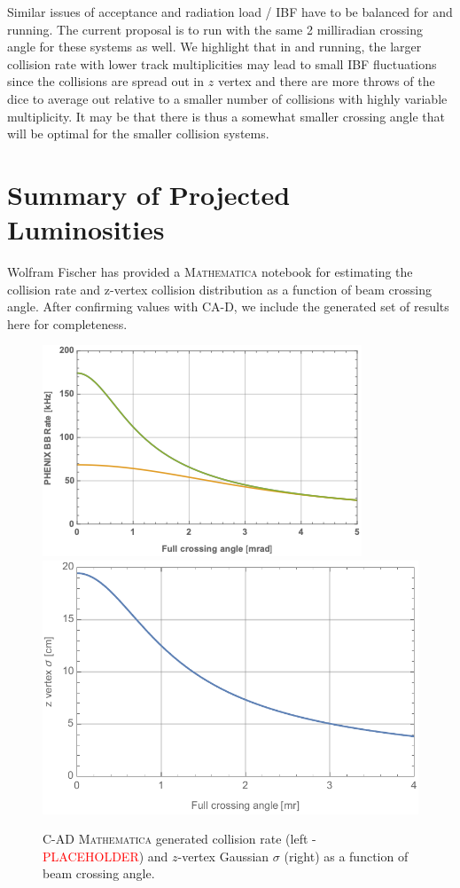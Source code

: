 Similar issues of acceptance and radiation load / IBF have to be balanced for \pp and \pau running.   The current proposal is to run with the same 2 milliradian crossing angle for these systems as well.    We highlight that in \pp and \pau running, the larger collision rate with lower track multiplicities may lead to small IBF fluctuations since the collisions are spread out in $z$ vertex and there are more throws of the dice to average out relative to a smaller number of \auau collisions with highly variable multiplicity.     It may be that there is thus a somewhat smaller crossing angle that will be optimal for the smaller collision systems.    

\section{Summary of Projected Luminosities} 

Wolfram Fischer has provided a {\textsc{Mathematica}} notebook for estimating the collision rate and z-vertex collision distribution as a function of beam crossing angle.\cite{Ruggiero:2002jn}  After confirming values with CA-D, we include the generated set of results here for completeness.    

\begin{figure}
    \centering
        \includegraphics[width=0.47\linewidth]{figs/figure_cad1_prelim.png}  
    \includegraphics[width=0.47\linewidth]{figs/auau2023-202008130.pdf}
    \caption{C-AD {\textsc{Mathematica}} generated \auau collision rate (left - {\textcolor{red}{PLACEHOLDER}}) and $z$-vertex Gaussian $\sigma$ (right) as a function of beam crossing angle.}
    \label{fig:mathauau1}
\end{figure}

